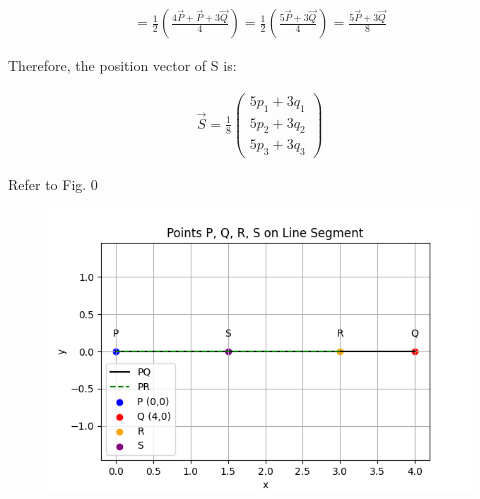 \documentclass[journal]{IEEEtran}
\begin{document}
\begin{align}
= \frac{1}{2} \left( \frac{4\vec{P} + \vec{P} + 3\vec{Q}}{4} \right )
= \frac{1}{2} \left( \frac{5\vec{P} + 3\vec{Q}}{4} \right )
= \frac{5\vec{P} + 3\vec{Q}}{8}
\end{align}

Therefore, the position vector of S is:

\begin{align}
\boxed{
\vec{S} =
\frac{1}{8}
\begin{pmatrix}
5p_1 + 3q_1 \\
5p_2 + 3q_2 \\
5p_3 + 3q_3
\end{pmatrix}
}
\end{align}

Refer to Fig. 0

\begin{figure}[H]
\begin{center}
\includegraphics[width=0.75\columnwidth]{figs/graph.png}
\end{center}
\caption{}
\label{fig:Fig}
\end{figure}
\end{document}
